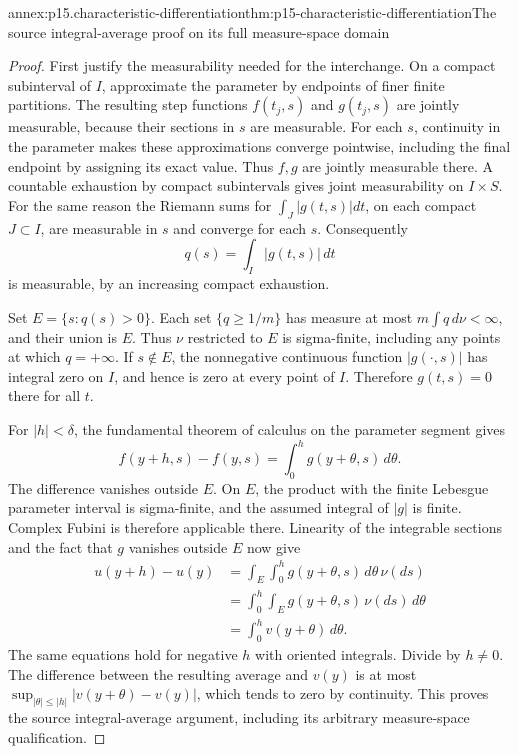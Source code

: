 \begin{annexitem}{annex:p15.characteristic-differentiation}{thm:p15-characteristic-differentiation}{The source integral-average proof on its full measure-space domain}
\begin{proof}
First justify the measurability needed for the interchange.
On a compact subinterval of \(I\), approximate the parameter
by endpoints of finer finite partitions. The resulting
step functions \(f(t_j,s)\) and \(g(t_j,s)\) are jointly
measurable, because their sections in \(s\) are measurable.
For each \(s\), continuity in the parameter makes these
approximations converge pointwise, including the final
endpoint by assigning its exact value. Thus \(f,g\) are
jointly measurable there. A countable exhaustion by compact
subintervals gives joint measurability on \(I\times S\).
For the same reason the Riemann sums for
\(\int_J|g(t,s)|dt\), on each compact \(J\subset I\),
are measurable in \(s\) and converge for each \(s\).
Consequently
\[
 q(s)=\int_I|g(t,s)|\,dt
\]
is measurable, by an increasing compact exhaustion.

Set \(E=\{s:q(s)>0\}\).
Each set \(\{q\geq1/m\}\) has measure at most
\(m\int q\,d\nu<\infty\), and their union is \(E\).
Thus \(\nu\) restricted to \(E\) is sigma-finite,
including any points at which \(q=+\infty\).
If \(s\notin E\), the nonnegative continuous function
\(|g(\cdot,s)|\) has integral zero on \(I\), and hence
is zero at every point of \(I\). Therefore \(g(t,s)=0\)
there for all \(t\).

For \(|h|<\delta\), the fundamental theorem of calculus
on the parameter segment gives
\[
 f(y+h,s)-f(y,s)=\int_0^h g(y+\theta,s)\,d\theta.
\]
The difference vanishes outside \(E\).
On \(E\), the product with the finite Lebesgue parameter
interval is sigma-finite, and the assumed integral of
\(|g|\) is finite. Complex Fubini is therefore applicable
there. Linearity of the integrable sections and the fact
that \(g\) vanishes outside \(E\) now give
\[
 \begin{aligned}
 u(y+h)-u(y)
 &=\int_E\int_0^h g(y+\theta,s)\,d\theta\,\nu(ds)\\
 &=\int_0^h\int_E g(y+\theta,s)\,\nu(ds)\,d\theta\\
 &=\int_0^h v(y+\theta)\,d\theta.
 \end{aligned}
\]
The same equations hold for negative \(h\) with oriented
integrals. Divide by \(h\ne0\). The difference between
the resulting average and \(v(y)\) is at most
\(\sup_{|\theta|\leq|h|}|v(y+\theta)-v(y)|\), which
tends to zero by continuity. This proves the source
integral-average argument, including its arbitrary
measure-space qualification.
\end{proof}
\end{annexitem}

